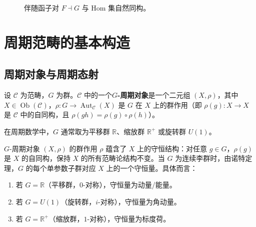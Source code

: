 \begin{figure}[htbp]
\centering
{}
\vspace{0.3cm}
\caption{伴随函子对 $F\dashv G$ 与 Hom 集自然同构。}
\label{fig:adjoint_functor}
\end{figure}

\section{周期范畴的基本构造}\label{sec:periodic_category_basic}

\subsection{周期对象与周期态射}

\begin{definition}[周期对象]\label{def:periodic_object}
设 $\mathcal{C}$ 为范畴，$G$ 为群。$\mathcal{C}$ 中的一个\textbf{$G$-周期对象}是一个二元组 $(X, \rho)$，其中 $X \in \operatorname{Ob}(\mathcal{C})$，$\rho: G \to \operatorname{Aut}_{\mathcal{C}}(X)$ 是 $G$ 在 $X$ 上的群作用（即 $\rho(g): X \to X$ 是 $\mathcal{C}$ 中的自同构，且 $\rho(gh) = \rho(g) \circ \rho(h)$）。

在周期数学中，$G$ 通常取为平移群 $\mathbb{R}$、缩放群 $\mathbb{R}^+$ 或旋转群 $U(1)$。
\end{definition}

\begin{proposition}[周期对象与守恒律]\label{prop:periodic_object_conservation}
$G$-周期对象 $(X, \rho)$ 的群作用 $\rho$ 蕴含了 $X$ 上的守恒结构：对任意 $g \in G$，$\rho(g)$ 是 $X$ 的自同构，保持 $X$ 的所有范畴论结构不变。当 $G$ 为连续李群时，由诺特定理，$G$ 的每个单参数子群对应 $X$ 上的一个守恒量。具体而言：
\begin{enumerate}[label=(\roman*)]
    \item 若 $G = \mathbb{R}$（平移群，$0$-对称），守恒量为动量/能量。
    \item 若 $G = U(1)$（旋转群，$i$-对称），守恒量为角动量。
    \item 若 $G = \mathbb{R}^+$（缩放群，$1$-对称），守恒量为标度荷。
\end{enumerate}
\end{proposition}

